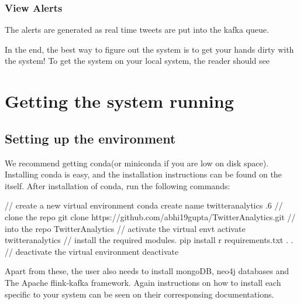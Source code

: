\documentclass[letterpaper,10pt,english]{sphinxmanual}
\begin{document}
\noindent{}


\subsection{View Alerts}
\label{\detokenize{dashboard_website:view-alerts}}
The alerts are generated as real time tweets are put into the kafka queue.

\noindent{}

In the end, the best way to figure out the system is to get your hands dirty with the system! To get the system on your local system, the reader should see {\hyperref[\detokenize{running:getting-the-system-running}]{}}


\chapter{Getting the system running}
\label{\detokenize{running:getting-the-system-running}}\label{\detokenize{running::doc}}

\section{Setting up the environment}
\label{\detokenize{running:setting-up-the-environment}}
We recommend getting conda(or miniconda if you are low on disk space). Installing conda is easy, and the installation instructions can be found on the  itself. After installation of conda, run the following commands:

\begin{sphinxVerbatim}[commandchars=\\\{\}]
// create a new virtual environment
conda create \PYGZhy{}\PYGZhy{}name twitter\PYGZus{}analytics .6
// clone the repo
git clone https://github.com/abhi19gupta/TwitterAnalytics.git
//  into the repo
 TwitterAnalytics
// activate the virtual envt
 activate twitter\PYGZus{}analytics
// install the required modules.
pip install \PYGZhy{}r requirements.txt
.
.
// deactivate the virtual environment
 deactivate
\end{sphinxVerbatim}

Apart from these, the user also needs to install mongoDB, neo4j databases and The Apache flink-kafka framework. Again instructions on how to install each specific to your system can be seen on their corresponsing documentations.
\end{document}
